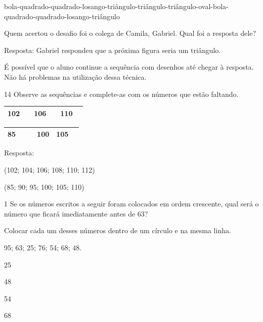 \begin{escolha}
bola-quadrado-quadrado-losango-triângulo-triângulo-triângulo-oval-bola-quadrado-quadrado-losango-triângulo

Quem acertou o desafio foi o colega de Camila, Gabriel. Qual foi a resposta dele?


Resposta:
Gabriel respondeu que a próxima figura seria um triângulo.

É possível que o aluno continue a sequência com desenhos até chegar à resposta. Não há problemas na utilização dessa técnica.


\num{14} Observe as sequências e complete-as com os números que estão faltando.

\begin{escolha}

\item
\end{escolha}

\begin{longtable}[]{@{}llllll@{}}
\toprule
102 & & 106 & & 110 &\tabularnewline
\bottomrule
\end{longtable}

\begin{escolha}

\item
\end{escolha}

\begin{longtable}[]{@{}llllll@{}}
\toprule
85 & & & 100 & 105 &\tabularnewline
\bottomrule
\end{longtable}

Resposta:

\begin{escolha}

\item
  (102; 104; 106; 108; 110; 112)
\item
  (85; 90; 95; 100; 105; 110)
\end{escolha}


\num{1} Se os números escritos a seguir foram colocados em ordem crescente, qual
será o número que ficará imediatamente antes de 63?

Colocar cada um desses números dentro de um círculo e na mesma linha.

95; 63; 25; 76; 54; 68; 48.

\begin{escolha}

\item
  25
\item
  48
\item
  54
\item
  68
\end{escolha}


\end{escolha}
